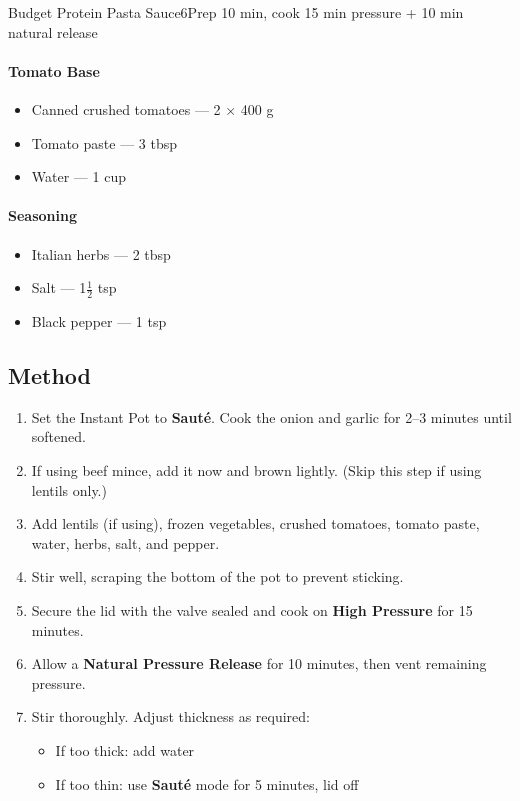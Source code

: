 \begin{recipebox}{Budget Protein Pasta Sauce}{6}{Prep 10 min, cook 15 min pressure + 10 min natural release}
\paragraph{Tomato Base}
\begin{itemize}
    \item Canned crushed tomatoes — 2 $\times$ 400 g
    \item Tomato paste — 3 tbsp
    \item Water — 1 cup
\end{itemize}

\paragraph{Seasoning}
\begin{itemize}
    \item Italian herbs — 2 tbsp
    \item Salt — 1$\tfrac{1}{2}$ tsp
    \item Black pepper — 1 tsp
\end{itemize}

\subsection*{Method}
\begin{enumerate}
    \item Set the Instant Pot to \textbf{Sauté}. Cook the onion and garlic for 2--3 minutes until softened.
    \item If using beef mince, add it now and brown lightly. (Skip this step if using lentils only.)
    \item Add lentils (if using), frozen vegetables, crushed tomatoes, tomato paste, water, herbs, salt, and pepper.
    \item Stir well, scraping the bottom of the pot to prevent sticking.
    \item Secure the lid with the valve sealed and cook on \textbf{High Pressure} for 15 minutes.
    \item Allow a \textbf{Natural Pressure Release} for 10 minutes, then vent remaining pressure.
    \item Stir thoroughly. Adjust thickness as required:
    \begin{itemize}
        \item If too thick: add water
        \item If too thin: use \textbf{Sauté} mode for 5 minutes, lid off
    \end{itemize}
\end{enumerate}


\end{recipebox}
